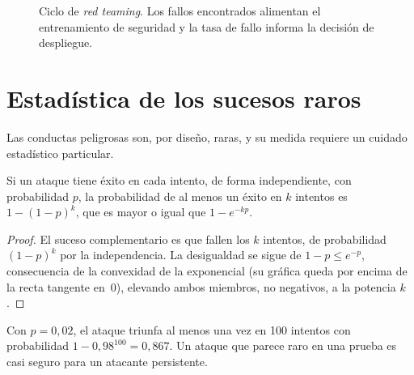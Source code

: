 \begin{figure}[h]
\centering
{}
\caption{Ciclo de \emph{red teaming}. Los fallos encontrados alimentan el entrenamiento de seguridad y la tasa de fallo informa la decisión de despliegue.}
\label{fig:redteam}
\end{figure}

\section{Estadística de los sucesos raros}

Las conductas peligrosas son, por diseño, raras, y su medida requiere un cuidado estadístico particular.

\begin{proposicion}\label{prop:intentos}
Si un ataque tiene éxito en cada intento, de forma independiente, con probabilidad $p$, la probabilidad de al menos un éxito en $k$ intentos es $1-(1-p)^{k}$, que es mayor o igual que $1-e^{-kp}$.
\end{proposicion}

\begin{proof}
El suceso complementario es que fallen los $k$ intentos, de probabilidad $(1-p)^{k}$ por la independencia. La desigualdad se sigue de $1-p\le e^{-p}$, consecuencia de la convexidad de la exponencial (su gráfica queda por encima de la recta tangente en~0), elevando ambos miembros, no negativos, a la potencia $k$.
\end{proof}

Con $p=0{,}02$, el ataque triunfa al menos una vez en 100 intentos con probabilidad $1-0{,}98^{100}=0{,}867$. Un ataque que parece raro en una prueba es casi seguro para un atacante persistente.

